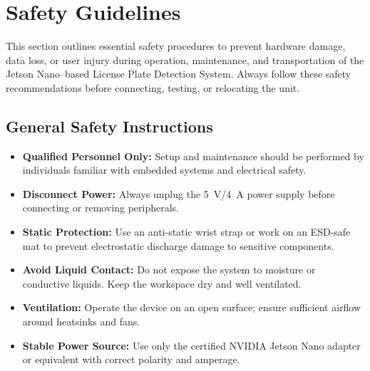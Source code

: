 %
%
%



\chapter{Safety Guidelines}

This section outlines essential safety procedures to prevent hardware damage, data loss, or user injury during operation, maintenance, and transportation of the Jetson Nano–based License Plate Detection System.  
Always follow these safety recommendations before connecting, testing, or relocating the unit.

\section{General Safety Instructions}

\begin{itemize}
	\item \textbf{Qualified Personnel Only:} Setup and maintenance should be performed by individuals familiar with embedded systems and electrical safety.
	\item \textbf{Disconnect Power:} Always unplug the \SI{5}{\volt}/\SI{4}{\ampere} power supply before connecting or removing peripherals.
	\item \textbf{Static Protection:} Use an anti-static wrist strap or work on an ESD-safe mat to prevent electrostatic discharge damage to sensitive components.
	\item \textbf{Avoid Liquid Contact:} Do not expose the system to moisture or conductive liquids. Keep the workspace dry and well ventilated.
	\item \textbf{Ventilation:} Operate the device on an open surface; ensure sufficient airflow around heatsinks and fans.
	\item \textbf{Stable Power Source:} Use only the certified NVIDIA Jetson Nano adapter or equivalent with correct polarity and amperage.
\end{itemize}

\vspace{0.4cm}

